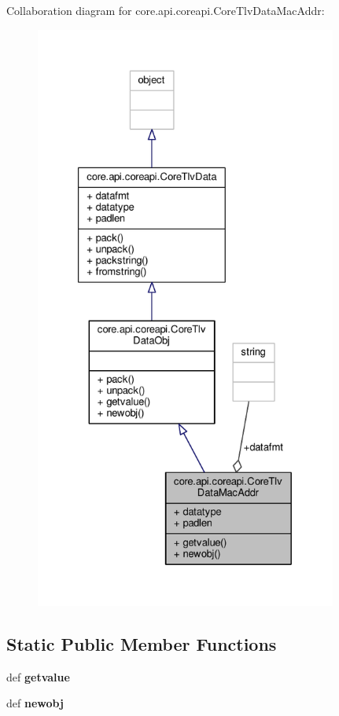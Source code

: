 Collaboration diagram for core.\+api.\+coreapi.\+Core\+Tlv\+Data\+Mac\+Addr\+:
\nopagebreak
\begin{figure}[H]
\begin{center}
\leavevmode
\includegraphics[height=550pt]{classcore_1_1api_1_1coreapi_1_1_core_tlv_data_mac_addr__coll__graph}
\end{center}
\end{figure}
\subsection*{Static Public Member Functions}
\begin{DoxyCompactItemize}
\item 
\hypertarget{classcore_1_1api_1_1coreapi_1_1_core_tlv_data_mac_addr_a25698df024147fb8f76099c2683ca121}{def {\bfseries getvalue}}\label{classcore_1_1api_1_1coreapi_1_1_core_tlv_data_mac_addr_a25698df024147fb8f76099c2683ca121}

\item 
\hypertarget{classcore_1_1api_1_1coreapi_1_1_core_tlv_data_mac_addr_aa9352ef40b4ef001c3c31676a23f612e}{def {\bfseries newobj}}\label{classcore_1_1api_1_1coreapi_1_1_core_tlv_data_mac_addr_aa9352ef40b4ef001c3c31676a23f612e}

\end{DoxyCompactItemize}
